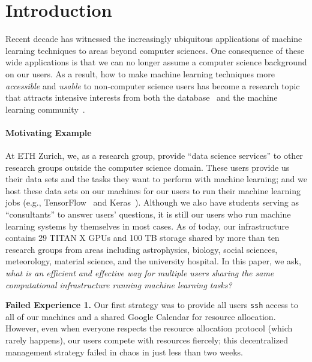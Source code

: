 \documentclass[letterpaper]{vldb}
\begin{document}
\section{Introduction}\label{sec:introduction}

Recent decade has witnessed the increasingly 
ubiquitous applications of machine learning techniques 
to areas beyond computer sciences. 
One consequence of these wide applications
is that we can no longer assume a computer science 
background on our users. As a result, how to make
machine learning techniques more {\em accessible} and
{\em usable} to non-computer science users has become
a research topic that attracts intensive interests
from both the database~\cite{XXX,XXX,XXX,XXX,XXX}
and the machine learning community~\cite{XXX,XXX,XXX,XXX,XXX}.

\paragraph*{Motivating Example} At ETH Zurich,
we, as a research group, provide ``data science
services'' to other research groups outside the computer science domain.
These users provide
us their data sets and the tasks they 
want to perform with machine learning; and
we host these data sets on our machines
for our users to run their machine learning
jobs (e.g.,
TensorFlow~\cite{XXX} and Keras~\cite{XXX}).
Although we also have students serving as ``consultants''
to answer users' questions, it is still our
users who run machine learning systems
by themselves in most cases. As of today, our infrastructure
contains 29 TITAN X GPUs and 100 TB storage
shared by more than ten research groups
from areas including astrophysics,
biology, social sciences, meteorology, 
material science, and the university hospital.
In this paper, we ask, {\em what is an
efficient and effective way for multiple users sharing 
the same computational infrastructure running
machine learning tasks?}

\vspace{0.3em}
\noindent
{\bf Failed Experience 1.} Our first strategy was to provide
all users \texttt{ssh} access to all of our machines
and a shared Google Calendar for resource allocation.
However, even when everyone respects the resource allocation
protocol (which rarely happens), our users compete with 
resources fiercely; this decentralized management strategy failed in chaos in just less than two weeks. 
\end{document}
